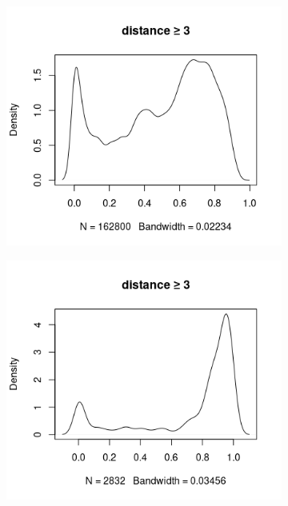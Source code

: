 \documentclass{l4proj}
\theoremstyle{definition}
\theoremstyle{remark}
\begin{document}
\begin{appendices}
\begin{figure}
    \begin{subfigure}[t]{0.49\textwidth}
      \centering
      \includegraphics[width=\textwidth]{images/mcs_prop3.png}
    \end{subfigure}
    \begin{subfigure}[t]{0.49\textwidth}
      \centering
      \includegraphics[width=\textwidth]{images/sip_prop3.png}
    \end{subfigure}
    \begin{subfigure}[t]{0.49\textwidth}

\end{subfigure}
\end{figure}
\end{appendices}
\end{document}
